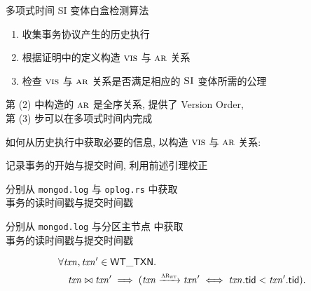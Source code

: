 
\begin{frame}{}

  \begin{center}
	多项式时间 SI 变体白盒检测算法
  \end{center}
\end{frame}

\begin{frame}{}

  \begin{enumerate}[(1)]
	\setlength{\itemsep}{6pt}
	\item 收集事务协议产生的历史执行
	\item 根据证明中的定义构造 $\textsc{vis}$ 与 $\textsc{ar}$ 关系
	\item 检查 $\textsc{vis}$ 与 $\textsc{ar}$ 关系是否满足相应的 $\textsc{SI}$ 变体所需的公理
  \end{enumerate}

  \pause
  \vspace{0.20cm}
  \begin{center}
	第 (2) 中构造的 $\textsc{ar}$ 是全序关系, 提供了 Version Order, \\[5pt]
	第 (3) 步可以在多项式时间内完成
  \end{center}
\end{frame}

\begin{frame}{}
  \begin{center}
	如何从历史执行中获取必要的信息, 以构造 $\textsc{vis}$ 与 $\textsc{ar}$ 关系:
  \end{center}

  \vspace{0.30cm}
  \begin{description}[$\scalg:$]
	\setlength{\itemsep}{10pt}
	\item[$\wtalg:$] 记录事务的开始与提交时间, 利用前述引理校正
	\item[$\rsalg:$] 分别从 \texttt{mongod.log} 与 \texttt{oplog.rs} 中获取 \\[5pt]
	  事务的读时间戳与提交时间戳
	\item[$\scalg:$] 分别从 \texttt{mongod.log} 与分区主节点 \oplog{} 中获取 \\[5pt]
	  事务的读时间戳与提交时间戳
  \end{description}

  \vspace{0.20cm}
  \begin{lemma}[冲突事务的提交顺序]
	\vspace{-0.30cm}
    \begin{align*}
      &\forall \mathit{txn}, \mathit{txn}' \in {\sf WT\_TXN}.\; \\
    	  &\quad \mathit{txn} \bowtie \mathit{txn}' \implies (\mathit{txn} \xrightarrow{\textsc{ar}_{\textsc{wt}}} \mathit{txn}'
    	  \iff \mathit{txn}.{\sf tid} < \mathit{txn}'.{\sf tid}).
    \end{align*}
  \end{lemma}
\end{frame}

